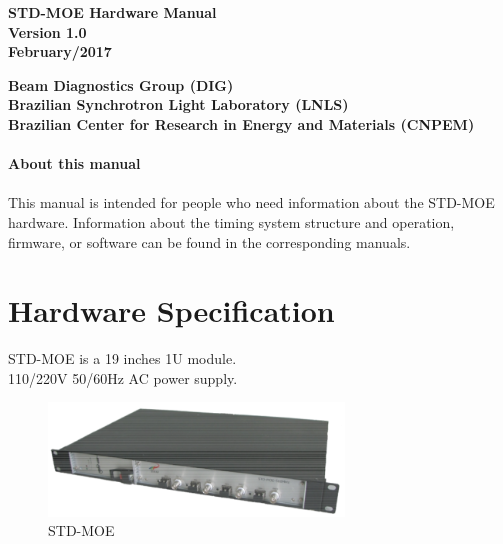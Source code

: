 \documentclass[openany]{article}
\begin{document}
\begin{titlepage}

\thispagestyle{fancy}

\begin{center}

\vspace*{\fill}
\textbf{\Huge STD-MOE Hardware Manual}\\[20pt]
\textbf{\Huge Version 1.0}\\[20pt]
\textbf{\Huge February/2017}
\vspace*{\fill}

\vfill
\textbf{Beam Diagnostics Group (DIG)}\\[5pt]
\textbf{Brazilian Synchrotron Light Laboratory (LNLS)}\\[5pt]
\textbf{Brazilian Center for Research in Energy and Materials (CNPEM)}
\end{center}

\end{titlepage}

\newpage
\pagestyle{plain}

\paragraph{}{\Large\bfseries About this manual}

\paragraph{} This manual is intended for people who need information about the STD-MOE hardware. Information about the timing system structure and operation, firmware, or software can be found in the corresponding manuals.

\tableofcontents

\newpage

\section{Hardware Specification}

\par STD-MOE is a 19 inches 1U module. \\ 110/220V 50/60Hz AC power supply.

\begin{figure}[!h]
\caption{STD-MOE}
\label{fig:std-moe}
\centering
\includegraphics[width=0.7\textwidth]{std-moe-image}
\end{figure}
\end{document}
